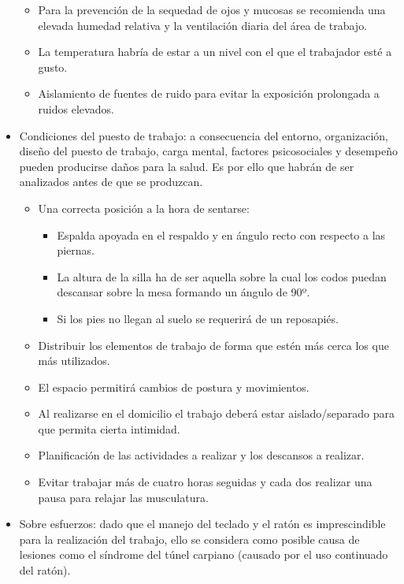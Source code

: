 \documentclass[12pt, a4paper]{book} %
\begin{document}
\begin{itemize}
\begin{itemize}
					\item Para la prevención de la sequedad de ojos y mucosas se recomienda una elevada humedad relativa y la ventilación diaria del área de trabajo.
					\item La temperatura habría de estar a un nivel con el que el trabajador esté a gusto.
					\item Aislamiento de fuentes de ruido para evitar la exposición prolongada a ruidos elevados.
				\end{itemize}
				\item Condiciones del puesto de trabajo: a consecuencia del entorno, organización, diseño del puesto de trabajo, carga mental, factores psicosociales y desempeño pueden producirse daños para la salud. Es por ello que habrán de ser analizados antes de que se produzcan.
				\begin{itemize}
					\item Una correcta posición a la hora de sentarse:
					\begin{itemize}
						\item Espalda apoyada en el respaldo y en ángulo recto con respecto a las piernas.
						\item La altura de la silla ha de ser aquella sobre la cual los codos puedan descansar sobre la mesa formando un ángulo de 90º.
						\item Si los pies no llegan al suelo se requerirá de un reposapiés.
					\end{itemize}
					\item Distribuir los elementos de trabajo de forma que estén más cerca los que más utilizados.
					\item El espacio permitirá cambios de postura y movimientos.
					\item Al realizarse en el domicilio el trabajo deberá estar aislado/separado para que permita cierta intimidad.
					\item Planificación de las actividades a realizar y los descansos a realizar. 
					\item Evitar trabajar más de cuatro horas seguidas y cada dos realizar una pausa para relajar las musculatura.
				\end{itemize}
				\item Sobre esfuerzos: dado que el manejo del teclado y el ratón es imprescindible para la realización del trabajo, ello se considera como posible causa de lesiones como el síndrome del túnel carpiano (causado por el uso continuado del ratón).
				\begin{itemize}

\end{itemize}
\end{itemize}
\end{document}
